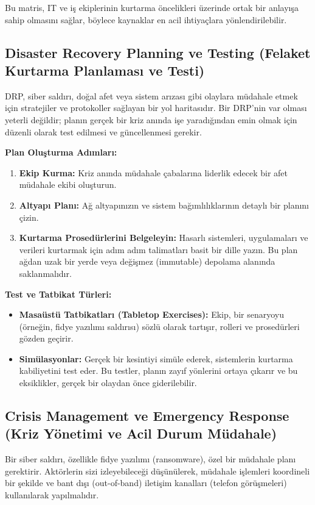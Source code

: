 Bu matris, IT ve iş ekiplerinin kurtarma öncelikleri üzerinde ortak bir anlayışa sahip olmasını sağlar, böylece kaynaklar en acil ihtiyaçlara yönlendirilebilir.

\subsection{Disaster Recovery Planning ve Testing (Felaket Kurtarma Planlaması ve Testi)}

DRP, siber saldırı, doğal afet veya sistem arızası gibi olaylara müdahale etmek için stratejiler ve protokoller sağlayan bir yol haritasıdır. Bir DRP'nin var olması yeterli değildir; planın gerçek bir kriz anında işe yaradığından emin olmak için düzenli olarak test edilmesi ve güncellenmesi gerekir.

\textbf{Plan Oluşturma Adımları:}
\begin{enumerate}
    \item \textbf{Ekip Kurma:} Kriz anında müdahale çabalarına liderlik edecek bir afet müdahale ekibi oluşturun.
    \item \textbf{Altyapı Planı:} Ağ altyapınızın ve sistem bağımlılıklarının detaylı bir planını çizin.
    \item \textbf{Kurtarma Prosedürlerini Belgeleyin:} Hasarlı sistemleri, uygulamaları ve verileri kurtarmak için adım adım talimatları basit bir dille yazın. Bu plan ağdan uzak bir yerde veya değişmez (immutable) depolama alanında saklanmalıdır.
\end{enumerate}

\textbf{Test ve Tatbikat Türleri:}
\begin{itemize}
    \item \textbf{Masaüstü Tatbikatları (Tabletop Exercises):} Ekip, bir senaryoyu (örneğin, fidye yazılımı saldırısı) sözlü olarak tartışır, rolleri ve prosedürleri gözden geçirir.
    \item \textbf{Simülasyonlar:} Gerçek bir kesintiyi simüle ederek, sistemlerin kurtarma kabiliyetini test eder. Bu testler, planın zayıf yönlerini ortaya çıkarır ve bu eksiklikler, gerçek bir olaydan önce giderilebilir.
\end{itemize}

\subsection{Crisis Management ve Emergency Response (Kriz Yönetimi ve Acil Durum Müdahale)}

Bir siber saldırı, özellikle fidye yazılımı (ransomware), özel bir müdahale planı gerektirir. Aktörlerin sizi izleyebileceği düşünülerek, müdahale işlemleri koordineli bir şekilde ve bant dışı (out-of-band) iletişim kanalları (telefon görüşmeleri) kullanılarak yapılmalıdır.

